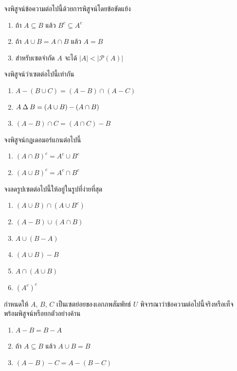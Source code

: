 \begin{exercise}
จงพิสูจน์ข้อความต่อไปนี้ด้วยการพิสูจน์โดยข้อขัดแย้ง
\begin{enumerate}
    \item ถ้า $A \subseteq B$ แล้ว $B^c \subseteq A^c$
    \item ถ้า $A \cup B = A \cap B$ แล้ว $A = B$
    \item สำหรับเซตจำกัด $A$ จะได้ $|A| < |\mathcal{P}(A)|$
\end{enumerate}
\end{exercise}

\begin{exercise}
จงพิสูจน์ว่าเซตต่อไปนี้เท่ากัน
\begin{enumerate}
    \item $A - (B \cup C) = (A - B) \cap (A - C)$
    \item $A \mathbin{\Delta} B = (A \cup B) - (A \cap B)$
    \item $(A - B) \cap C = (A \cap C) - B$
\end{enumerate}
\end{exercise}

\begin{exercise}
จงพิสูจน์กฎเดอมอร์แกนต่อไปนี้
\begin{enumerate}
    \item $(A \cap B)^c = A^c \cup B^c$
    \item $(A \cup B)^c = A^c \cap B^c$
\end{enumerate}
\end{exercise}

\begin{exercise}
จงลดรูปเซตต่อไปนี้ให้อยู่ในรูปที่ง่ายที่สุด
\begin{enumerate}
    \item $(A \cup B) \cap (A \cup B^c)$
    \item $(A - B) \cup (A \cap B)$
    \item $A \cup (B - A)$
    \item $(A \cup B) - B$
    \item $A \cap (A \cup B)$
    \item $(A^c)^c$
\end{enumerate}
\end{exercise}

\begin{exercise}
กำหนดให้ $A$, $B$, $C$ เป็นเซตย่อยของเอกภพสัมพัทธ์ $U$ พิจารณาว่าข้อความต่อไปนี้จริงหรือเท็จ พร้อมพิสูจน์หรือยกตัวอย่างค้าน
\begin{enumerate}
    \item $A - B = B - A$
    \item ถ้า $A \subseteq B$ แล้ว $A \cup B = B$
    \item $(A - B) - C = A - (B - C)$
\end{enumerate}
\end{exercise}

